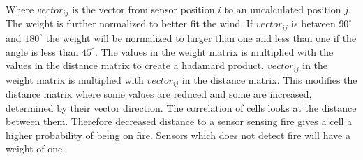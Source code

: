 Where $ vector_{ij} $ is the vector from sensor position $i$ to an uncalculated position $j$. The weight is further normalized to better fit the wind. If $ vector_{ij} $ is between $ 90^{\circ} $ and $ 180^{\circ} $ the weight will be normalized to larger than one and less than one if the angle is less than $ 45^{\circ} $. The values in the weight matrix is multiplied with the values in the distance matrix to create a hadamard\cite{hadamard} product. $ vector_{ij} $ in the weight matrix is multiplied with $ vector_{ij} $ in the distance matrix. This modifies the distance matrix where some values are reduced and some are increased, determined by their vector direction. The correlation of cells looks at the distance between them. Therefore decreased distance to a sensor sensing fire gives a cell a higher probability of being on fire. Sensors which does not detect fire will have a weight of one.
